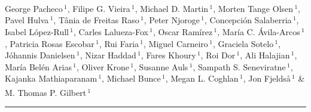 \documentclass[twoside, british, a4paper]{article}
\newcommand\myhline{%
  \noindent\rule[.5pt]{\linewidth}{.4pt}\par%
}
\begin{document}
\thispagestyle{empty}

\hfill\break

\Large{\bfseries{\color[rgb]{0,0,0}}} \\

\hfill
\hfill

\LARGE{\bfseries{\color[rgb]{0.25,0.25,0.25}}} \\

 \small \noindent 
George Pacheco\,$^{1}$\textsuperscript{\faEnvelopeO},
Filipe G. Vieira\,$^{1}$,
Michael D. Martin\,$^{1}$,
Morten Tange Olsen\,$^{1}$,
Pavel Hulva\,$^{1}$,
Tânia de Freitas Raso\,$^{1}$,
Peter Njoroge\,$^{1}$,
Concepción Salaberria\,$^{1}$,
Isabel López-Rull\,$^{1}$,
Carles Lalueza-Fox\,$^{1}$,
Oscar Ramírez\,$^{1}$,
María C. Ávila-Arcos\,$^{1}$,
Patricia Rosas Escobar\,$^{1}$,
Rui Faria\,$^{1}$,
Miguel Carneiro\,$^{1}$,
Graciela Sotelo\,$^{1}$,
Jóhannis Danielsen\,$^{1}$,
Nizar Haddad\,$^{1}$,
Fares Khoury\,$^{1}$,
Roi Dor\,$^{1}$,
Ali Halajian\,$^{1}$,
María Belén Arias\,$^{1}$,
Oliver Krone\,$^{1}$,
Susanne Auls\,$^{1}$,
Sampath S. Seneviratne\,$^{1}$,
Kajanka Mathiaparanam\,$^{1}$,
Michael Bunce\,$^{1}$,
Megan L. Coghlan\,$^{1}$,
Jon Fjeldså\,$^{1}$ \&
M. Thomas P. Gilbert\,$^{1}$\textsuperscript{\faEnvelopeO} \\
\myhline
\end{document}
